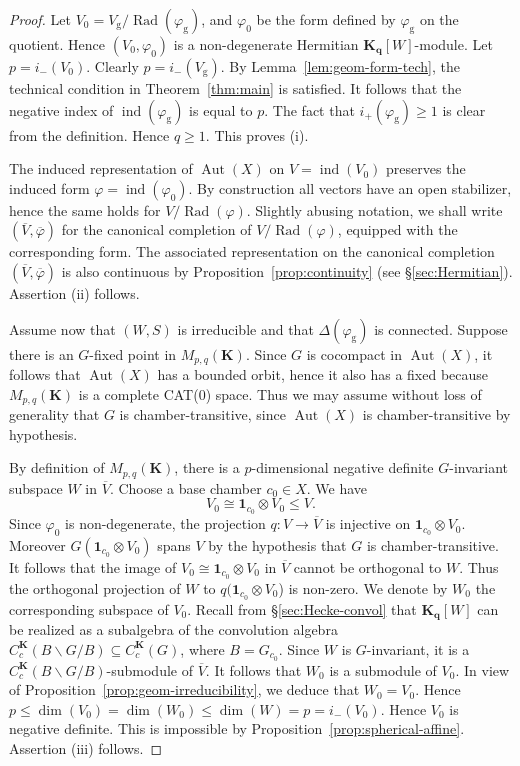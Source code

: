\documentclass[12pt,a4paper]{amsproc}
\theoremstyle{definition}
\DeclareMathOperator{\Aut}{Aut}
\DeclareMathOperator{\Ind}{ind}
\DeclareMathOperator{\Rad}{Rad}
\newcommand{\KK}{\mathbf K}
\newcommand{\one}{\mathbf 1}
\newcommand{\qq}{\mathbf q}
\newcommand{\rg}{\mathrm g}
\begin{document}
\begin{proof}
Let $V_0= V_\rg/\Rad(\varphi_\rg)$, and $\varphi_0$ be the form defined by $\varphi_\rg$ on the quotient. Hence $(V_0, \varphi_0)$ is a non-degenerate Hermitian $\KK_\qq[W]$-module. Let $p=i_-(V_0)$. Clearly $p = i_-(V_\rg)$. By Lemma~\ref{lem:geom-form-tech}, the technical condition in Theorem~\ref{thm:main} is satisfied. It follows that the negative index of $\Ind(\varphi_\rg)$ is equal to $p$. The fact that $i_+(\varphi_\rg) \geq 1$ is clear from the definition. Hence $q \geq 1$. This proves (i). 

The induced representation of $\Aut(X)$ on $V = \Ind(V_0)$ preserves the induced form $\varphi = \Ind(\varphi_0)$. By construction all vectors have an open stabilizer, hence the same holds for $V/\Rad(\varphi)$. Slightly abusing notation, we shall write $(\overline V, \overline \varphi)$  for the canonical completion of $V/\Rad(\varphi)$, equipped with the corresponding form. The associated representation on the  canonical completion $(\overline V, \overline \varphi)$ is also continuous   by Proposition~\ref{prop:continuity} (see \S\ref{sec:Hermitian}). Assertion (ii) follows. 

Assume now that $(W, S)$ is irreducible  and   that  $\Delta(\varphi_\rg)$ is connected. Suppose there is an $G$-fixed point in $M_{p, q}(\KK)$. Since $G$ is cocompact in $\Aut(X)$, it follows that $\Aut(X)$ has a bounded orbit, hence it also has a fixed because $M_{p, q}(\KK)$ is a complete CAT($0$) space. Thus we may assume without loss of generality that $G$ is chamber-transitive, since $\Aut(X)$ is chamber-transitive by hypothesis. 

By definition of $M_{p, q}(\KK)$,  there is a $p$-dimensional negative definite $G$-invariant subspace $W$ in $\overline V$. Choose a base chamber $c_0 \in X$. We have 
$$V_0 \cong \one_{c_0} \otimes V_0 \leq V.$$
Since $\varphi_0$ is non-degenerate, the projection $q \colon V \to \overline V$ is injective on $ \one_{c_0} \otimes V_0$. Moreover $G( \one_{c_0} \otimes V_0)$ spans $V$ by the hypothesis that $G$ is chamber-transitive. It follows that the image of $V_0 \cong \one_{c_0} \otimes V_0$  in $\overline V$ cannot be orthogonal to $W$. Thus the orthogonal projection of $W$ to $ q(\one_{c_0} \otimes V_0$) is non-zero. We denote by $W_0$ the corresponding subspace of $V_0$. Recall from \S\ref{sec:Hecke-convol} that $\KK_\qq[W]$ can be realized as a subalgebra of the convolution algebra $C_c^\KK(B\backslash G/B) \subseteq C_c^\KK(G)$, where $B = G_{c_0}$. Since $W$ is $G$-invariant, it is a $C_c^\KK(B\backslash G/B)$-submodule of $\overline V$.  It follows that  $W_0$ is a submodule of $V_0$. In view of Proposition~\ref{prop:geom-irreducibility}, we deduce that $W_0=V_0$. Hence 
$p \leq \dim(V_0) = \dim(W_0) \leq \dim(W) =p = i_-(V_0)$. Hence $V_0$ is negative definite. This is impossible by Proposition~\ref{prop:spherical-affine}. Assertion (iii) follows. 


\end{proof}
\end{document}
